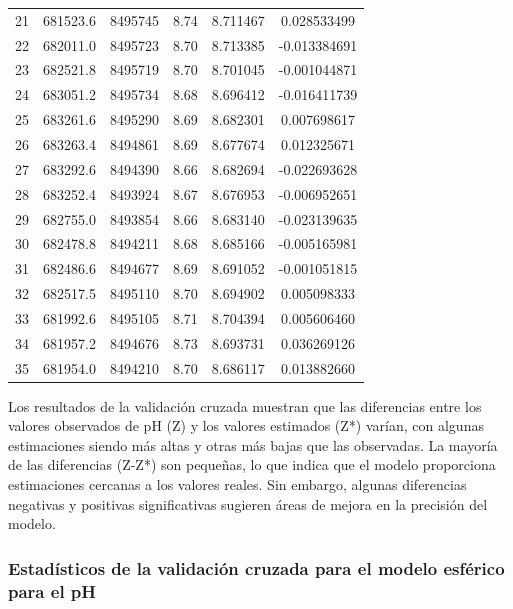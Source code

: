 \begin{table}[H]
\begin{tabular}{cccccc}
21 & 681523.6 & 8495745 & 8.74 & 8.711467 & 0.028533499 \\
22 & 682011.0 & 8495723 & 8.70 & 8.713385 & -0.013384691 \\
23 & 682521.8 & 8495719 & 8.70 & 8.701045 & -0.001044871 \\
24 & 683051.2 & 8495734 & 8.68 & 8.696412 & -0.016411739 \\
25 & 683261.6 & 8495290 & 8.69 & 8.682301 & 0.007698617 \\
26 & 683263.4 & 8494861 & 8.69 & 8.677674 & 0.012325671 \\
27 & 683292.6 & 8494390 & 8.66 & 8.682694 & -0.022693628 \\
28 & 683252.4 & 8493924 & 8.67 & 8.676953 & -0.006952651 \\
29 & 682755.0 & 8493854 & 8.66 & 8.683140 & -0.023139635 \\
30 & 682478.8 & 8494211 & 8.68 & 8.685166 & -0.005165981 \\
31 & 682486.6 & 8494677 & 8.69 & 8.691052 & -0.001051815 \\
32 & 682517.5 & 8495110 & 8.70 & 8.694902 & 0.005098333 \\
33 & 681992.6 & 8495105 & 8.71 & 8.704394 & 0.005606460 \\
34 & 681957.2 & 8494676 & 8.73 & 8.693731 & 0.036269126 \\
35 & 681954.0 & 8494210 & 8.70 & 8.686117 & 0.013882660 \\ \hline
\end{tabular}
\end{table}


Los resultados de la validación cruzada muestran que las diferencias entre los valores observados de pH (Z) y los valores estimados (Z*) varían, con algunas estimaciones siendo más altas y otras más bajas que las observadas. La mayoría de las diferencias (Z-Z*) son pequeñas, lo que indica que el modelo proporciona estimaciones cercanas a los valores reales. Sin embargo, algunas diferencias negativas y positivas significativas sugieren áreas de mejora en la precisión del modelo.

\subsubsection{Estadísticos de la validación cruzada para el modelo esférico para el pH }


